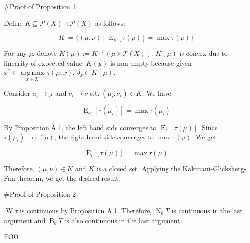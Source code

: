 \documentclass[a4paper]{article}
\DeclareMathOperator{\E}{E}
\newcommand{\Argmax}[1]{\underset{#1}{\operatorname{arg\,max}}\,}
\newcommand{\Prob}{\mathcal{P}}
\newcommand{\B}{\operatorname{B}_b}
\newcommand{\N}{\operatorname{N}_b}
\newcommand{\W}{\operatorname{W}}
\begin{document}
\#Proof of Proposition 1

Define ${K \subseteq \Prob(X) \times \Prob(X)}$ as follows:

$$K:=\{(\mu,\nu) \mid \E_\nu[\tau(\mu)] = \max \tau(\mu)\}$$

For any ${\mu}$, denote ${K(\mu):=K \cap (\mu \times \Prob(X))}$. ${K}(\mu)$ is convex due to linearity of expected value. ${K(\mu)}$ is non-empty because given ${x^* \in \Argmax{x \in X} \tau(\mu,x)}$, ${\delta_x \in K(\mu)}$.

Consider ${\mu_i \rightarrow \mu}$ and ${\nu_i \rightarrow \nu}$ s.t. ${(\mu_i,\nu_i) \in K}$. We have

$$\E_{\nu_i}[\tau(\mu_i)] = \max \tau(\mu_i)$$

By Proposition A.1, the left hand side converges to ${\E_{\nu}[\tau(\mu)]}$. Since ${\tau(\mu_i) \rightarrow \tau(\mu)}$, the right hand side converges to ${\max \tau(\mu)}$. We get:

$$\E_{\nu}[\tau(\mu)] = \max \tau(\mu)$$

Therefore, ${(\mu,\nu) \in K}$ and ${K}$ is a closed set. Applying the Kakutani-Glicksberg-Fan theorem, we get the desired result.

\#Proof of Proposition 2

${\W \tau}$ is continuous by Proposition A.1. Therefore, ${\N T}$ is continuous in the last argument and ${\B T}$ is also continuous in the last argument.

FOO
\end{document}

